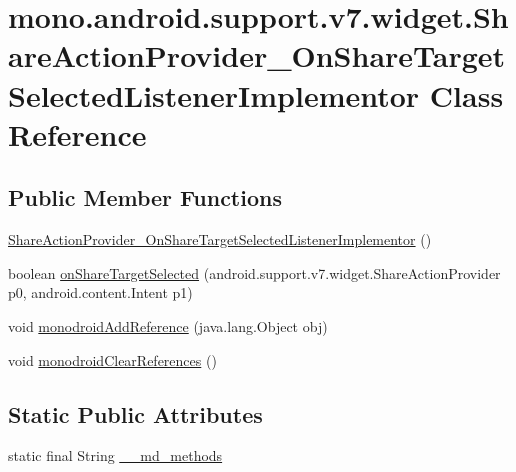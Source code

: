 \hypertarget{classmono_1_1android_1_1support_1_1v7_1_1widget_1_1_share_action_provider___on_share_target_selected_listener_implementor}{
\section{mono.android.support.v7.widget.ShareActionProvider\_\-OnShareTargetSelectedListenerImplementor Class Reference}
\label{classmono_1_1android_1_1support_1_1v7_1_1widget_1_1_share_action_provider___on_share_target_selected_listener_implementor}
}
\subsection*{Public Member Functions}
\begin{CompactItemize}
\item 
\hyperlink{classmono_1_1android_1_1support_1_1v7_1_1widget_1_1_share_action_provider___on_share_target_selected_listener_implementor_2bbca254ac73b0e847fe464477cead55}{ShareActionProvider\_\-OnShareTargetSelectedListenerImplementor} ()
\item 
boolean \hyperlink{classmono_1_1android_1_1support_1_1v7_1_1widget_1_1_share_action_provider___on_share_target_selected_listener_implementor_cd158ea7fad91d537c19f92888995fad}{onShareTargetSelected} (android.support.v7.widget.ShareActionProvider p0, android.content.Intent p1)
\item 
void \hyperlink{classmono_1_1android_1_1support_1_1v7_1_1widget_1_1_share_action_provider___on_share_target_selected_listener_implementor_56c3e72e0afae02044279e72744f2c14}{monodroidAddReference} (java.lang.Object obj)
\item 
void \hyperlink{classmono_1_1android_1_1support_1_1v7_1_1widget_1_1_share_action_provider___on_share_target_selected_listener_implementor_6365fd94f326b807c545489837189d68}{monodroidClearReferences} ()
\end{CompactItemize}
\subsection*{Static Public Attributes}
\begin{CompactItemize}
\item 
static final String \hyperlink{classmono_1_1android_1_1support_1_1v7_1_1widget_1_1_share_action_provider___on_share_target_selected_listener_implementor_32a6cc09bf050bf79d6e842469167e17}{\_\-\_\-md\_\-methods}
\end{CompactItemize}
